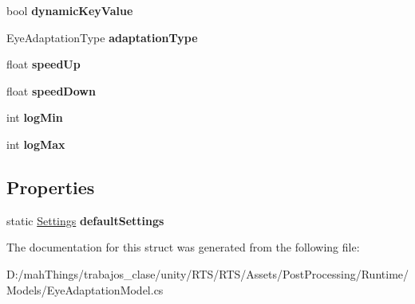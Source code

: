 \begin{DoxyCompactItemize}
bool {\bfseries dynamic\+Key\+Value}
\item 
\mbox{\label{struct_unity_engine_1_1_post_processing_1_1_eye_adaptation_model_1_1_settings_a9dc6f8242b612ecfeaf1bb854e49a9f3}} 
Eye\+Adaptation\+Type {\bfseries adaptation\+Type}
\item 
\mbox{\label{struct_unity_engine_1_1_post_processing_1_1_eye_adaptation_model_1_1_settings_a16ecb91ebe339a0b0775a67a4eb04c61}} 
float {\bfseries speed\+Up}
\item 
\mbox{\label{struct_unity_engine_1_1_post_processing_1_1_eye_adaptation_model_1_1_settings_acf5028b7150072c3b3907e9b7cf0a878}} 
float {\bfseries speed\+Down}
\item 
\mbox{\label{struct_unity_engine_1_1_post_processing_1_1_eye_adaptation_model_1_1_settings_a9320d074e46d0714a75171f40e1c554d}} 
int {\bfseries log\+Min}
\item 
\mbox{\label{struct_unity_engine_1_1_post_processing_1_1_eye_adaptation_model_1_1_settings_ab1e84b7f5403c844e026677ce5e1c6ea}} 
int {\bfseries log\+Max}
\end{DoxyCompactItemize}
\subsection*{Properties}
\begin{DoxyCompactItemize}
\item 
\mbox{\label{struct_unity_engine_1_1_post_processing_1_1_eye_adaptation_model_1_1_settings_af84171d648e86938b92e10bf39a35ad1}} 
static \mbox{\hyperlink{struct_unity_engine_1_1_post_processing_1_1_eye_adaptation_model_1_1_settings}{Settings}} {\bfseries default\+Settings}
\end{DoxyCompactItemize}


The documentation for this struct was generated from the following file\+:\begin{DoxyCompactItemize}
\item 
D\+:/mah\+Things/trabajos\+\_\+clase/unity/\+R\+T\+S/\+R\+T\+S/\+Assets/\+Post\+Processing/\+Runtime/\+Models/Eye\+Adaptation\+Model.\+cs\end{DoxyCompactItemize}
